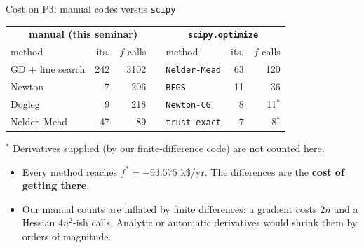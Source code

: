 \documentclass[aspectratio=169,10pt]{beamer}
\begin{document}
\begin{frame}{Cost on P3: manual codes versus \texttt{scipy}}
  \centering\small
  \begin{tabular}{lrrr@{\hskip 1.2cm}lrr}
    \toprule
    \multicolumn{4}{c}{\textbf{manual (this seminar)}} & \multicolumn{3}{c}{\textbf{\texttt{scipy.optimize}}}\\
    method & its. & $f$ calls & & method & its. & $f$ calls\\
    \midrule
    GD + line search & 242 & 3102 & & \texttt{Nelder-Mead} & 63 & 120\\
    Newton & 7 & 206 & & \texttt{BFGS} & 11 & 36\\
    Dogleg & 9 & 218 & & \texttt{Newton-CG} & 8 & 11$^{\ast}$\\
    Nelder--Mead & 47 & 89 & & \texttt{trust-exact} & 7 & 8$^{\ast}$\\
    \bottomrule
  \end{tabular}

  \vspace{0.3cm}
  \footnotesize $^{\ast}$ Derivatives supplied (by our finite-difference code) are not counted here.\\
  \normalsize
  \begin{itemize}
    \item Every method reaches $f^\ast=-93.575$ k\$/yr. The differences are the \textbf{cost of getting there}.
    \item Our manual counts are inflated by finite differences: a gradient costs $2n$ and a Hessian $4n^2$-ish calls. Analytic or automatic derivatives would shrink them by orders of magnitude.
  \end{itemize}
\end{frame}
\end{document}

